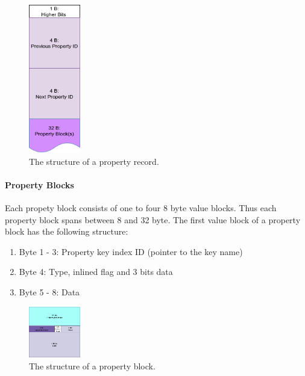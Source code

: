 \documentclass[a4paper,10pt]{article}
\begin{document}
    \begin{figure}[htp]\label{prop}
        \begin{center}
            \includegraphics[keepaspectratio,height=0.2\textheight,width=0.2\textwidth]{img/03_record/property/property.png}
        \end{center}
        \caption{The structure of a property record.} %
    \end{figure}
    
    \paragraph{Property Blocks} 
    Each propety block consists of one to four 8 byte value blocks. Thus each property block spans between 8 and 32 byte. The first value block of a property block has the following structure:
    \begin{enumerate}
     \item Byte 1 - 3: Property key index ID (pointer to the key name)
     \item Byte 4: Type, inlined flag and 3 bits data
     \item Byte 5 - 8: Data
    \end{enumerate}
    
    \begin{figure}[htp]\label{prop_block}
        \begin{center}
            \includegraphics[keepaspectratio,height=0.2\textheight,width=0.2\textwidth]{img/03_record/property/property_block.png}
        \end{center}
        \caption{The structure of a property block.} %
    \end{figure}
    
\end{document}
